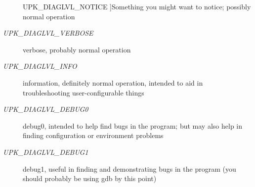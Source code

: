 \begin{Desc}
\begin{description}
{UPK\_\-DIAGLVL\_\-NOTICE\label{group__upk__errors_gga69a581dfd708ad2e18688e01cbcc0ff8a2d096c4906e4df530e7b2368d0169558}
}]Something you might want to notice; possibly normal operation \item[{\em 
UPK\_\-DIAGLVL\_\-VERBOSE\label{group__upk__errors_gga69a581dfd708ad2e18688e01cbcc0ff8af4ab159278a3a1599c370e89858ec888}
}]verbose, probably normal operation \item[{\em 
UPK\_\-DIAGLVL\_\-INFO\label{group__upk__errors_gga69a581dfd708ad2e18688e01cbcc0ff8a2bb69eb89e08c5587c87186e04b0aaa8}
}]information, definitely normal operation, intended to aid in troubleshooting user-\/configurable things \item[{\em 
UPK\_\-DIAGLVL\_\-DEBUG0\label{group__upk__errors_gga69a581dfd708ad2e18688e01cbcc0ff8af6a6be2812d975c859910213b5361e39}
}]debug0, intended to help find bugs in the program; but may also help in finding configuration or environment problems \item[{\em 
UPK\_\-DIAGLVL\_\-DEBUG1\label{group__upk__errors_gga69a581dfd708ad2e18688e01cbcc0ff8a77aa4e5c1c3416dea8d1e7299aaa1530}
}]debug1, useful in finding and demonstrating bugs in the program (you should probably be using gdb by this point) \end{description}
\end{Desc}

